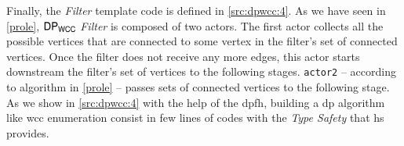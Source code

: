 Finally, the \textit{Filter} template code is defined in \autoref{src:dpwcc:4}. 
As we have seen in \autoref{prole}, $\mathsf{DP_{WCC}}$ \textit{Filter} is composed of two actors. The first actor collects all the possible vertices that are connected to some vertex in the filter's set of connected vertices. Once the filter does not receive any more edges, this actor starts downstream the filter's set of vertices to the following stages. \texttt{actor2} -- according to algorithm in \autoref{prole} -- passes sets of connected vertices  to the following stage. As we show in \autoref{src:dpwcc:4} with the help of the \acrlong{dpfh}, building a \acrshort{dp} algorithm like \acrshort{wcc} enumeration consist in few lines of codes with the \textit{Type Safety} that \acrshort{hs} provides.



